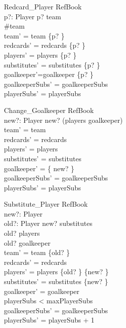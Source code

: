 \begin{schema}{Redcard\_Player}
  \Delta RefBook\\
   p?: Player
\where
   p? \in team\\
  \#team \\
  team' = team \setminus \{p? \}\\ 
   redcards' = redcards \cup \{p? \}\\
   players' = players \setminus \{p? \}\\
   substitutes' = substitutes \setminus \{p? \}\\ 
   goalkeeper'=goalkeeper \setminus \{p? \}\\
   goalkeeperSubs' = goalkeeperSubs\\
   playerSubs' = playerSubs\\
\end{schema}

\begin{schema}{Change\_Goalkeeper}
  \Delta RefBook\\
   new?: Player
\where
   new? \in (players \cup goalkeeper) \\
   team' = team \\
   redcards' = redcards \\
   players' = players \\
   substitutes' = substitutes \\
   goalkeeper' = \{ new? \}\\
   goalkeeperSubs' = goalkeeperSubs\\
   playerSubs' = playerSubs\\
\end{schema}

\begin{schema}{Substitute\_Player}
  \Delta RefBook\\
   new?: Player \\
   old?: Player
\where
   new? \in substitutes\\
   old? \in players \\
   old? \notin goalkeeper\\
   team' = team \setminus \{old? \}\\
   redcards' = redcards\\
   players' = players \setminus \{old? \} \cup \{new? \}\\
   substitutes' = substitutes \setminus \{new? \}\\ 
   goalkeeper' = goalkeeper\\
   playerSubs < maxPlayerSubs\\
   goalkeeperSubs' = goalkeeperSubs\\
   playerSubs' =  playerSubs + 1\\
\end{schema} 

